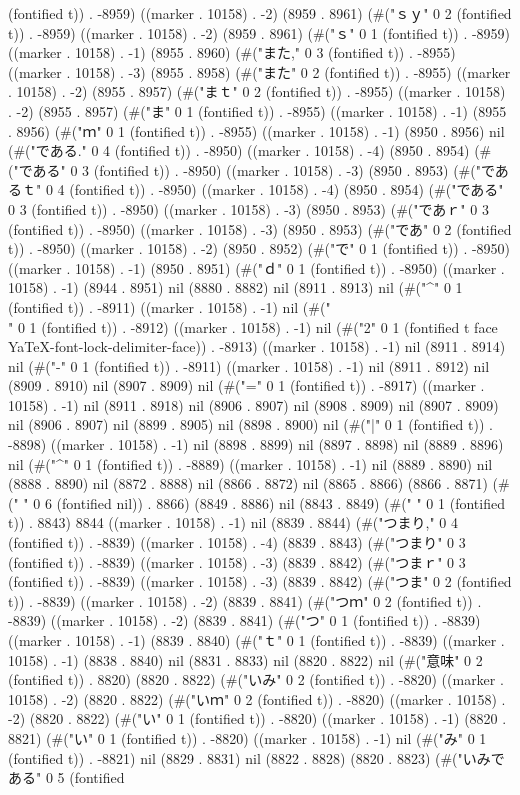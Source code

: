 {(fontified t)) . -8959) ((marker . 10158) . -2) (8959 . 8961) (#("ｓｙ" 0 2 (fontified t)) . -8959) ((marker . 10158) . -2) (8959 . 8961) (#("ｓ" 0 1 (fontified t)) . -8959) ((marker . 10158) . -1) (8955 . 8960) (#("また," 0 3 (fontified t)) . -8955) ((marker . 10158) . -3) (8955 . 8958) (#("また" 0 2 (fontified t)) . -8955) ((marker . 10158) . -2) (8955 . 8957) (#("まｔ" 0 2 (fontified t)) . -8955) ((marker . 10158) . -2) (8955 . 8957) (#("ま" 0 1 (fontified t)) . -8955) ((marker . 10158) . -1) (8955 . 8956) (#("ｍ" 0 1 (fontified t)) . -8955) ((marker . 10158) . -1) (8950 . 8956) nil (#("である." 0 4 (fontified t)) . -8950) ((marker . 10158) . -4) (8950 . 8954) (#("である" 0 3 (fontified t)) . -8950) ((marker . 10158) . -3) (8950 . 8953) (#("であるｔ" 0 4 (fontified t)) . -8950) ((marker . 10158) . -4) (8950 . 8954) (#("である" 0 3 (fontified t)) . -8950) ((marker . 10158) . -3) (8950 . 8953) (#("であｒ" 0 3 (fontified t)) . -8950) ((marker . 10158) . -3) (8950 . 8953) (#("であ" 0 2 (fontified t)) . -8950) ((marker . 10158) . -2) (8950 . 8952) (#("で" 0 1 (fontified t)) . -8950) ((marker . 10158) . -1) (8950 . 8951) (#("ｄ" 0 1 (fontified t)) . -8950) ((marker . 10158) . -1) (8944 . 8951) nil (8880 . 8882) nil (8911 . 8913) nil (#("^" 0 1 (fontified t)) . -8911) ((marker . 10158) . -1) nil (#("\\" 0 1 (fontified t)) . -8912) ((marker . 10158) . -1) nil (#("2" 0 1 (fontified t face YaTeX-font-lock-delimiter-face)) . -8913) ((marker . 10158) . -1) nil (8911 . 8914) nil (#("-" 0 1 (fontified t)) . -8911) ((marker . 10158) . -1) nil (8911 . 8912) nil (8909 . 8910) nil (8907 . 8909) nil (#("=" 0 1 (fontified t)) . -8917) ((marker . 10158) . -1) nil (8911 . 8918) nil (8906 . 8907) nil (8908 . 8909) nil (8907 . 8909) nil (8906 . 8907) nil (8899 . 8905) nil (8898 . 8900) nil (#("|" 0 1 (fontified t)) . -8898) ((marker . 10158) . -1) nil (8898 . 8899) nil (8897 . 8898) nil (8889 . 8896) nil (#("^" 0 1 (fontified t)) . -8889) ((marker . 10158) . -1) nil (8889 . 8890) nil (8888 . 8890) nil (8872 . 8888) nil (8866 . 8872) nil (8865 . 8866) (8866 . 8871) (#("	     " 0 6 (fontified nil)) . 8866) (8849 . 8886) nil (8843 . 8849) (#(" " 0 1 (fontified t)) . 8843) 8844 ((marker . 10158) . -1) nil (8839 . 8844) (#("つまり," 0 4 (fontified t)) . -8839) ((marker . 10158) . -4) (8839 . 8843) (#("つまり" 0 3 (fontified t)) . -8839) ((marker . 10158) . -3) (8839 . 8842) (#("つまｒ" 0 3 (fontified t)) . -8839) ((marker . 10158) . -3) (8839 . 8842) (#("つま" 0 2 (fontified t)) . -8839) ((marker . 10158) . -2) (8839 . 8841) (#("つｍ" 0 2 (fontified t)) . -8839) ((marker . 10158) . -2) (8839 . 8841) (#("つ" 0 1 (fontified t)) . -8839) ((marker . 10158) . -1) (8839 . 8840) (#("ｔ" 0 1 (fontified t)) . -8839) ((marker . 10158) . -1) (8838 . 8840) nil (8831 . 8833) nil (8820 . 8822) nil (#("意味" 0 2 (fontified t)) . 8820) (8820 . 8822) (#("いみ" 0 2 (fontified t)) . -8820) ((marker . 10158) . -2) (8820 . 8822) (#("いｍ" 0 2 (fontified t)) . -8820) ((marker . 10158) . -2) (8820 . 8822) (#("い" 0 1 (fontified t)) . -8820) ((marker . 10158) . -1) (8820 . 8821) (#("い" 0 1 (fontified t)) . -8820) ((marker . 10158) . -1) nil (#("み" 0 1 (fontified t)) . -8821) nil (8829 . 8831) nil (8822 . 8828) (8820 . 8823) (#("いみである" 0 5 (fontified }
